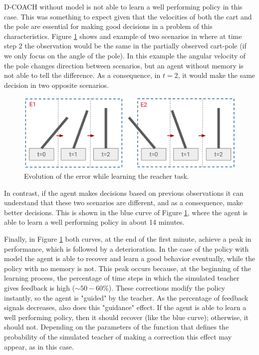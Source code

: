 D-COACH without model is not able to learn a well performing policy in this case. This was something to expect given that the velocities of both the cart and the pole are essential for making good decisions in a problem of this characteristics. Figure \ref{fig:cp_ex} shows and example of two scenarios in where at time step 2 the observation would be the same in the partially observed cart-pole (if we only focus on the angle of the pole). In this example the angular velocity of the pole changes direction between scenarios, but an agent without memory is not able to tell the difference. As a consequence, in $t=2$, it would make the same decision in two opposite scenarios.

\begin{figure}[h]
    \centering
    \includegraphics[width=0.9\linewidth]{imagenes/cap4/cartpole_ex.png}
    \caption{Evolution of the error while learning the reacher task. }
    \label{fig:cp_ex}
\end{figure}

In contrast, if the agent makes decisions based on previous observations it can understand that these two scenarios are different, and as a consequence, make better decisions. This is shown in the blue curve of Figure \ref{fig:cp_ex}, where the agent is able to learn a well performing policy in about 14 minutes. 

Finally, in  Figure \ref{fig:cp_ex} both curves, at the end of the first minute, achieve a peak in performance, which is followed by a deterioration. In the case of the policy with model the agent is able to recover and learn a good behavior eventually, while the policy with no memory is not. This peak occurs because, at the beginning of the learning process, the percentage of time steps in which the simulated teacher gives feedback is high ($\sim 50-60 \%$). These corrections modify the policy instantly, so the agent is "guided" by the teacher. As the percentage of feedback signals decreases, also does this "guidance" effect. If the agent is able to learn a well performing policy, then it should recover (like the blue curve); otherwise, it should not. Depending on the parameters of the function that defines the probability of the simulated teacher of making a correction this effect may appear, as in this case.

